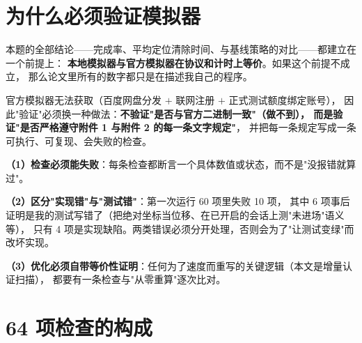 \section{为什么必须验证模拟器}

本题的全部结论——完成率、平均定位清除时间、与基线策略的对比——都建立在一个前提上：
\textbf{本地模拟器与官方模拟器在协议和计时上等价}。如果这个前提不成立，
那么论文里所有的数字都只是在描述我自己的程序。

官方模拟器无法获取（百度网盘分发 $+$ 联网注册 $+$ 正式测试额度绑定账号），
因此"验证"必须换一种做法：\textbf{不验证"是否与官方二进制一致"（做不到），
而是验证"是否严格遵守附件 1 与附件 2 的每一条文字规定"}，
并把每一条规定写成一条可执行、可复现、会失败的检查。

\begin{keybox}[title=验证的设计原则]
\textbf{（1）检查必须能失败}：每条检查都断言一个具体数值或状态，而不是"没报错就算过"。\par
\textbf{（2）区分"实现错"与"测试错"}：第一次运行 60 项里失败 10 项，
其中 6 项事后证明是我的测试写错了（把绝对坐标当位移、在已开启的会话上测"未进场"语义等），
只有 4 项是实现缺陷。两类错误必须分开处理，否则会为了"让测试变绿"而改坏实现。\par
\textbf{（3）优化必须自带等价性证明}：任何为了速度而重写的关键逻辑（本文是增量认证扫描），
都要有一条检查与"从零重算"逐次比对。
\end{keybox}

\section{64 项检查的构成}

